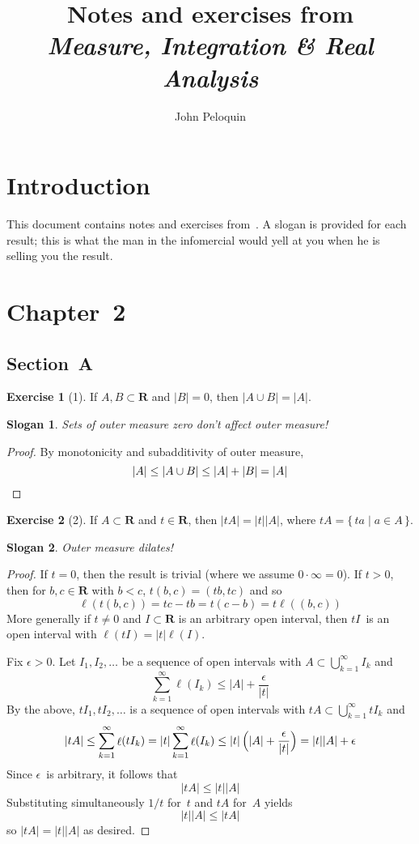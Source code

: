 \documentclass[letterpaper,12pt]{article}
\title{Notes and exercises from\\\emph{Measure, Integration \& Real Analysis}}
\author{John Peloquin}
\date{}
\newcommand{\R}{\mathbf{R}}
\newcommand{\union}{\cup}
\newcommand{\bigunion}{\bigcup}
\newcommand{\mult}{\cdot}
\DeclareMathOperator{\len}{\ell}
\newcommand{\abs}[1]{|#1|}
\renewcommand{\l}[1]{\len(#1)}
\newcommand{\m}[1]{|#1|}
\theoremstyle{definition}
\newtheorem*{exer}{Exercise}
\theoremstyle{remark}
\theoremstyle{plain}
\newtheorem*{slogan}{Slogan}
\begin{document}
\maketitle

\section*{Introduction}
This document contains notes and exercises from~\cite{axler}. A slogan is provided for each result; this is what the man in the infomercial would yell at you when he is selling you the result.

\section*{Chapter~2}
\subsection*{Section~A}

\begin{exer}[1]
If \(A,B\subset\R\) and \(\m{B}=0\), then \(\m{A\union B}=\m{A}\).
\end{exer}
\begin{slogan}
Sets of outer measure zero don't affect outer measure!
\end{slogan}
\begin{proof}
By monotonicity and subadditivity of outer measure,
\[\m{A}\le\m{A\union B}\le\m{A}+\m{B}=\m{A}\qedhere\]
\end{proof}

\begin{exer}[2]
If \(A\subset\R\) and \(t\in\R\), then \(\m{tA}=\abs{t}\m{A}\), where \(tA=\{\,ta\mid a\in A\,\}\).
\end{exer}
\begin{slogan}
Outer measure dilates!
\end{slogan}
\begin{proof}
If \(t=0\), then the result is trivial (where we assume \(0\mult\infty=0\)). If \(t>0\), then for \(b,c\in\R\) with \(b<c\), \(t(b,c)=(tb,tc)\) and so
\[\l{t(b,c)}=tc-tb=t(c-b)=t\l{(b,c)}\]
More generally if \(t\ne0\) and \(I\subset\R\) is an arbitrary open interval, then \(tI\)~is an open interval with \(\l{tI}=\abs{t}\l{I}\).

Fix \(\epsilon>0\). Let \(I_1,I_2,\ldots\) be a sequence of open intervals with \(A\subset\bigunion_{k=1}^{\infty}I_k\) and
\[\sum_{k=1}^{\infty}\l{I_k}\le\m{A}+\frac{\epsilon}{\abs{t}}\]
By the above, \(tI_1,tI_2,\ldots\) is a sequence of open intervals with \(tA\subset\bigunion_{k=1}^{\infty}tI_k\) and
\[\m{tA}\le\sum_{k=1}^{\infty}\l{tI_k}=\abs{t}\sum_{k=1}^{\infty}\l{I_k}\le\abs{t}\,\Bigl(\m{A}+\frac{\epsilon}{\abs{t}}\Bigr)=\abs{t}\m{A}+\epsilon\]
Since \(\epsilon\)~is arbitrary, it follows that
\[\m{tA}\le\abs{t}\m{A}\]
Substituting simultaneously \(1/t\) for~\(t\) and \(tA\) for~\(A\) yields
\[\abs{t}\m{A}\le\m{tA}\]
so \(\m{tA}=\abs{t}\m{A}\) as desired.
\end{proof}
\end{document}

